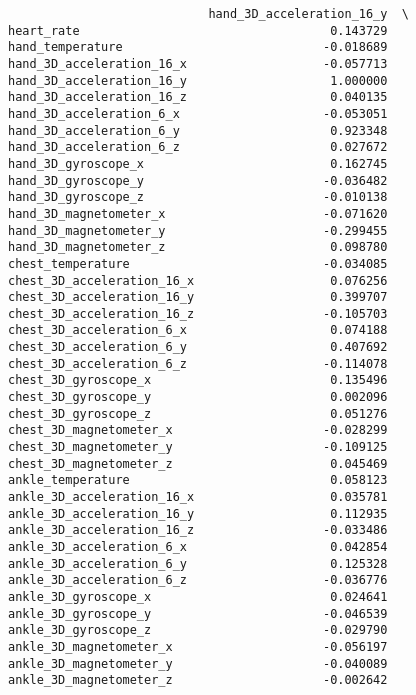 \documentclass[11pt]{article}
\begin{document}
\begin{verbatim}
                            hand_3D_acceleration_16_y  \
heart_rate                                   0.143729   
hand_temperature                            -0.018689   
hand_3D_acceleration_16_x                   -0.057713   
hand_3D_acceleration_16_y                    1.000000   
hand_3D_acceleration_16_z                    0.040135   
hand_3D_acceleration_6_x                    -0.053051   
hand_3D_acceleration_6_y                     0.923348   
hand_3D_acceleration_6_z                     0.027672   
hand_3D_gyroscope_x                          0.162745   
hand_3D_gyroscope_y                         -0.036482   
hand_3D_gyroscope_z                         -0.010138   
hand_3D_magnetometer_x                      -0.071620   
hand_3D_magnetometer_y                      -0.299455   
hand_3D_magnetometer_z                       0.098780   
chest_temperature                           -0.034085   
chest_3D_acceleration_16_x                   0.076256   
chest_3D_acceleration_16_y                   0.399707   
chest_3D_acceleration_16_z                  -0.105703   
chest_3D_acceleration_6_x                    0.074188   
chest_3D_acceleration_6_y                    0.407692   
chest_3D_acceleration_6_z                   -0.114078   
chest_3D_gyroscope_x                         0.135496   
chest_3D_gyroscope_y                         0.002096   
chest_3D_gyroscope_z                         0.051276   
chest_3D_magnetometer_x                     -0.028299   
chest_3D_magnetometer_y                     -0.109125   
chest_3D_magnetometer_z                      0.045469   
ankle_temperature                            0.058123   
ankle_3D_acceleration_16_x                   0.035781   
ankle_3D_acceleration_16_y                   0.112935   
ankle_3D_acceleration_16_z                  -0.033486   
ankle_3D_acceleration_6_x                    0.042854   
ankle_3D_acceleration_6_y                    0.125328   
ankle_3D_acceleration_6_z                   -0.036776   
ankle_3D_gyroscope_x                         0.024641   
ankle_3D_gyroscope_y                        -0.046539   
ankle_3D_gyroscope_z                        -0.029790   
ankle_3D_magnetometer_x                     -0.056197   
ankle_3D_magnetometer_y                     -0.040089   
ankle_3D_magnetometer_z                     -0.002642   


\end{verbatim}
\end{document}
